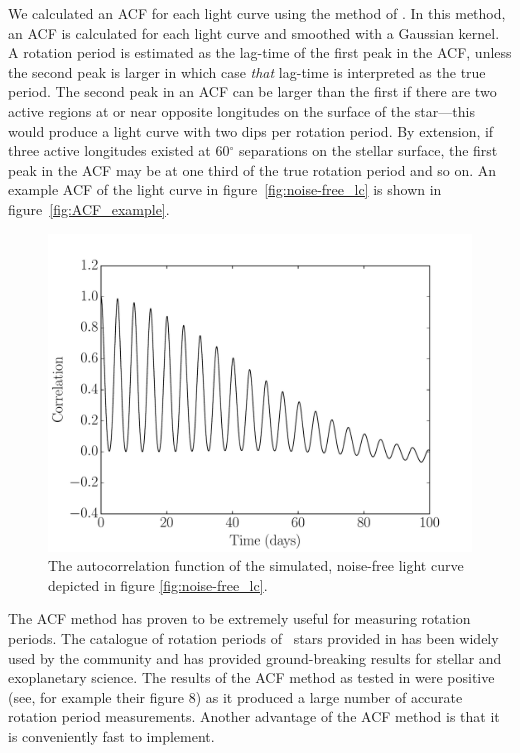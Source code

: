 We calculated an ACF for each light curve using the method of
\citet{Mcquillan13}.
In this method, an ACF is calculated for each light curve and smoothed with a
Gaussian kernel.
A rotation period is estimated as the lag-time of the first peak in the ACF,
unless the second peak is larger in which case {\it that} lag-time is
interpreted as the true period.
The second peak in an ACF can be larger than the first if there are two active
regions at or near opposite longitudes on the surface of the star---this would
produce a light curve with two dips per rotation period.
By extension, if three active longitudes existed at 60$^\circ$ separations on
the stellar surface, the first peak in the ACF may be at one third of the true
rotation period and so on.
An example ACF of the light curve in figure~\ref{fig:noise-free_lc} is shown
in figure~\ref{fig:ACF_example}.

\begin{figure}
\begin{center}
\includegraphics[width=6in, clip=true]{figures/noise-free_acf.pdf}
\caption[An ACF of a simulated light curve.]
{The autocorrelation function of the simulated, noise-free light
curve depicted in figure \ref{fig:noise-free_lc}.}
\end{center}
\end{figure}
\label{fig:ACF_example}

The ACF method has proven to be extremely useful for measuring rotation
periods.
The catalogue of rotation periods of \Kepler\ stars provided in
\citet{Mcquillan2013} has been widely used by the community and has provided
ground-breaking results for stellar and exoplanetary science.
The results of the ACF method as tested in \citet{Aigrain2015} were positive
(see, for example their figure 8) as it produced a large number of accurate
rotation period measurements.
Another advantage of the ACF method is that it is conveniently fast to
implement.

